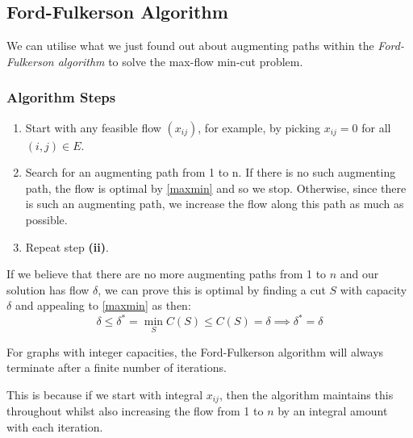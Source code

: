 \documentclass[../main.tex]{subfiles}
\begin{document}
\subsection{Ford-Fulkerson Algorithm}
We can utilise what we just found out about augmenting paths within the \textit{Ford-Fulkerson algorithm} to solve the max-flow min-cut problem.
\subsubsection{Algorithm Steps}
\begin{enumerate}
  \item Start with any feasible flow $(x_{i j})$, for example, by picking $x_{i j} = 0$ for all $(i, j) \in E$.
  \item Search for an augmenting path from 1 to n.
    If there is no such augmenting path, the flow is optimal by \cref{maxmin} and so we stop.
    Otherwise, since there is such an augmenting path, we increase the flow along this path as much as possible.
  \item Repeat step \textbf{(ii)}.
\end{enumerate}
If we believe that there are no more augmenting paths from 1 to $n$ and our solution has flow $\delta$, we can prove this is optimal by finding a cut $S$ with capacity $\delta$ and appealing to \cref{maxmin} as then:
\[
  \delta \leq \delta^{*} = \min_{S} C(S) \leq C(S) = \delta \implies \delta^{*} = \delta
\]
\begin{remark}
  For graphs with integer capacities, the Ford-Fulkerson algorithm will always terminate after a finite number of iterations.

  This is because if we start with integral $x_{i j}$, then the algorithm maintains this throughout whilst also increasing the flow from 1 to $n$ by an integral amount with each iteration.
\end{remark}
\end{document}
